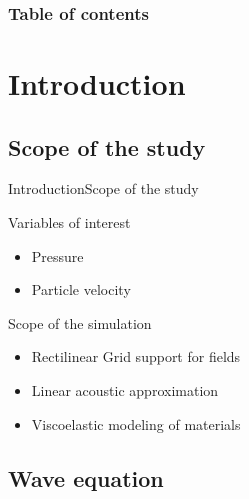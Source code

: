 \documentclass[9pt, xcolor={usenames, dvipsnames}]{beamer}
\begin{document}
		\begin{frame}
			\frametitle{Table of contents}
			\tableofcontents%
		\end{frame}

		\section{Introduction}

			\subsection{Scope of the study}

				\begin{frame}{Introduction}{Scope of the study}
					\centering
					\begin{minipage}{0.6\textwidth}
						\begin{block}{Variables of interest}
							\begin{itemize}
								\item Pressure
								\item Particle velocity
							\end{itemize}
						\end{block}
						\begin{block}{Scope of the simulation}
							\begin{itemize}
								\item Rectilinear Grid support for fields
								\item Linear acoustic approximation
								\item Viscoelastic modeling of materials
							\end{itemize}
						\end{block}
					\end{minipage}
				\end{frame}

			\subsection{Wave equation}
\end{document}
